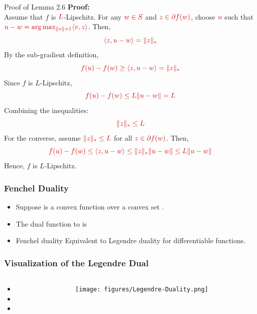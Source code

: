 \documentclass{beamer}
\newcommand{\mathred}[1]{\textcolor{mathred}{#1}}
\begin{document}
\begin{small}
\begin{frame}{Proof of Lemma 2.6}
\textbf{Proof:}\\
Assume that $f$ is $\mathred{L}$-Lipschitz. For any $\mathred{w \in S}$ and $\mathred{z \in \partial f(w)}$, choose $\mathred{u}$ such that $\mathred{u - w = \arg\max_{\|v\|=1} \langle v, z \rangle}$. Then,
\begin{equation*}
\mathred{\langle z, u - w \rangle = \|z\|_*}
\end{equation*}
By the sub-gradient definition,
\begin{equation*}
\mathred{f(u) - f(w) \geq \langle z, u - w \rangle = \|z\|_*}
\end{equation*}
Since $f$ is $L$-Lipschitz,
\begin{equation*}
\mathred{f(u) - f(w) \leq L \|u - w\| = L}
\end{equation*}
Combining the inequalities:
\begin{equation*}
\mathred{\|z\|_* \leq L}
\end{equation*}
For the converse, assume $\mathred{\|z\|_* \leq L}$ for all $\mathred{z \in \partial f(w)}$. Then,
\begin{equation*}
\mathred{f(u) - f(w) \leq \langle z, u - w \rangle \leq \|z\|_* \|u - w\| \leq L \|u - w\|}
\end{equation*}
Hence, $f$ is $L$-Lipschitz.
\end{frame}


\begin{frame}
\frametitle{Fenchel Duality}
\begin{itemize}
\item Suppose  is a convex function over a convex set .
\item The dual function to  is
  \item Fenchel duality Equivalent to Legendre duality for differentiable functions.

\end{itemize}
\end{frame}

\begin{frame}
  \frametitle{Visualization of the Legendre Dual}
  \begin{columns}
    \begin{column}{0.55\textwidth}
        \begin{itemize}
            \item {}
            \item {}
            \item {}
        \end{itemize}
    \end{column}
    \begin{column}{0.43\textwidth}
          \texttt{[image: figures/Legendre-Duality.png]}
    \end{column}
\end{columns}
\end{frame}


\end{small}
\end{document}
